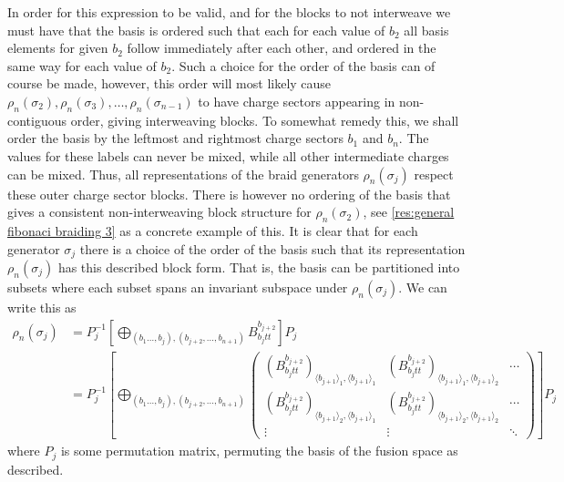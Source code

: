 \documentclass[a4paper,10pt,oneside]{book}
\theoremstyle{plain}
\theoremstyle{definition}
\theoremstyle{remark}
\begin{document}
In order for this expression to be valid, and for the blocks to not interweave we must have that the basis is ordered such that each for each value of $b_2$ all basis elements for given $b_2$ follow immediately after each other, and ordered in the same way for each value of $b_2$. Such a choice for the order of the basis can of course be made, however, this order will most likely cause $ρ_n(σ_2), ρ_n(σ_3), \dots, ρ_n(σ_{n-1})$ to have charge sectors appearing in non-contiguous order, giving interweaving blocks. To somewhat remedy this, we shall order the basis by the leftmost and rightmost charge sectors $b_1$ and $b_n$. The values for these labels can never be mixed, while all other intermediate charges can be mixed. Thus, all representations of the braid generators $ρ_n(σ_j)$ respect these outer charge sector blocks. There is however no ordering of the basis that gives a consistent non-interweaving block structure for $ρ_n(σ_2)$, see \cref{res:general fibonaci braiding 3} as a concrete example of this. It is clear that for each generator $σ_j$ there is a choice of the order of the basis such that its representation $ρ_n(σ_j)$ has this described block form. That is, the basis can be partitioned into subsets where each subset spans an invariant subspace under $ρ_n(σ_j)$. We can write this as
\begin{align*}
  ρ_n(σ_j)
  &= P_j^{-1} \left[\bigoplus_{(b_1\ldots,b_j),(b_{j+2}, \ldots, b_{n+1})} B_{b_{j}tt}^{b_{j+2}} \right]P_j \\
  &= P_j^{-1} \left[\bigoplus_{(b_1\ldots,b_j),(b_{j+2}, \ldots, b_{n+1})}
  \begin{pmatrix}
    \left( B_{b_{j}tt}^{b_{j+2}} \right)_{\langle b_{j+1} \rangle_1, \langle b_{j+1} \rangle_1} & \left( B_{b_{j}tt}^{b_{j+2}} \right)_{\langle b_{j+1} \rangle_1, \langle b_{j+1} \rangle_2} & \cdots \\
    \left( B_{b_{j}tt}^{b_{j+2}} \right)_{\langle b_{j+1} \rangle_2, \langle b_{j+1} \rangle_1} & \left( B_{b_{j}tt}^{b_{j+2}} \right)_{\langle b_{j+1} \rangle_2, \langle b_{j+1} \rangle_2} & \cdots \\
    \vdots & \vdots & \ddots
  \end{pmatrix}
  \right]P_j
\end{align*}
where $P_j$ is some permutation matrix, permuting the basis of the fusion space as described.
\end{document}
